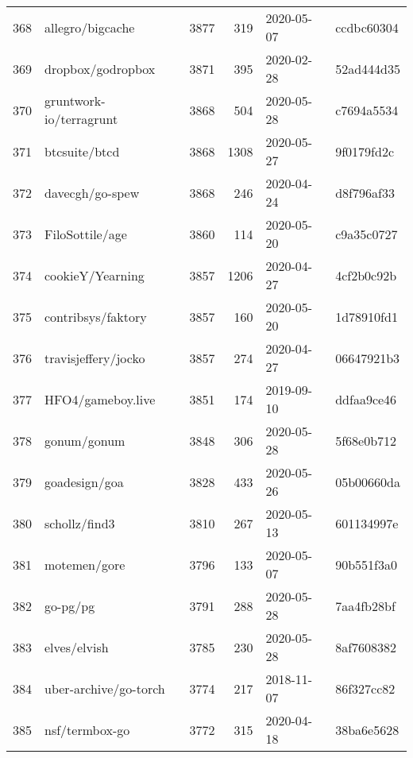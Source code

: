 \begin{longtable}{llrrll}
    368 &                                   allegro/bigcache &   3877 &    319 & 2020-05-07 &  ccdbc60304 \\
    369 &                                  dropbox/godropbox &   3871 &    395 & 2020-02-28 &  52ad444d35 \\
    370 &                            gruntwork-io/terragrunt &   3868 &    504 & 2020-05-28 &  c7694a5534 \\
    371 &                                      btcsuite/btcd &   3868 &   1308 & 2020-05-27 &  9f0179fd2c \\
    372 &                                    davecgh/go-spew &   3868 &    246 & 2020-04-24 &  d8f796af33 \\
    373 &                                    FiloSottile/age &   3860 &    114 & 2020-05-20 &  c9a35c0727 \\
    374 &                                   cookieY/Yearning &   3857 &   1206 & 2020-04-27 &  4cf2b0c92b \\
    375 &                                 contribsys/faktory &   3857 &    160 & 2020-05-20 &  1d78910fd1 \\
    376 &                                travisjeffery/jocko &   3857 &    274 & 2020-04-27 &  06647921b3 \\
    377 &                                  HFO4/gameboy.live &   3851 &    174 & 2019-09-10 &  ddfaa9ce46 \\
    378 &                                        gonum/gonum &   3848 &    306 & 2020-05-28 &  5f68e0b712 \\
    379 &                                      goadesign/goa &   3828 &    433 & 2020-05-26 &  05b00660da \\
    380 &                                      schollz/find3 &   3810 &    267 & 2020-05-13 &  601134997e \\
    381 &                                       motemen/gore &   3796 &    133 & 2020-05-07 &  90b551f3a0 \\
    382 &                                           go-pg/pg &   3791 &    288 & 2020-05-28 &  7aa4fb28bf \\
    383 &                                       elves/elvish &   3785 &    230 & 2020-05-28 &  8af7608382 \\
    384 &                              uber-archive/go-torch &   3774 &    217 & 2018-11-07 &  86f327cc82 \\
    385 &                                     nsf/termbox-go &   3772 &    315 & 2020-04-18 &  38ba6e5628 \\

\end{longtable}
